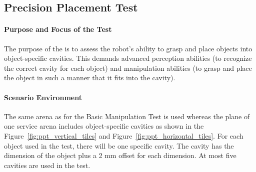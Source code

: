\newpage
\subsection{Precision Placement Test}

\paragraph{Purpose and Focus of the Test}
The purpose of the  is to assess the robot's ability to grasp and place objects into object-specific cavities. This demands advanced perception abilities (to recognize the correct cavity for each object) and manipulation abilities (to grasp and place the object in such a manner that it fits into the cavity).

\paragraph{Scenario Environment}
The same arena as for the Basic Manipulation Test is used whereas the plane of one service arena includes object-specific cavities as shown in the Figure~\ref{fig:ppt_vertical_tiles} and Figure~\ref{fig:ppt_horizontal_tiles}. For each object used in the test, there will be one specific cavity. The cavity has the dimension of the object plus a 2 mm offset for each dimension. At most five cavities are used in the test.


